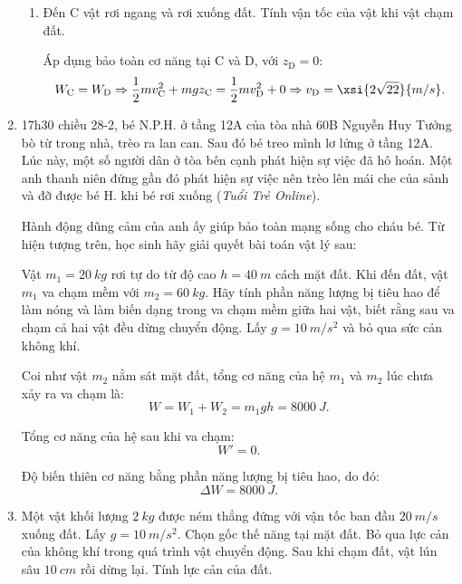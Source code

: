 \begin{enumerate}[label=\bfseries Câu \arabic*:]
{\begin{enumerate}[label=\alph*)]
			Độ cao điểm A là $z_\text{A} = h + R = \SI{4.4}{m}$.
			
			Độ cao điểm C là $z_\text{C} = h = \SI{2}{m}$.
			
			Áp dụng bảo toàn cơ năng tại A và C:
			$$W_\text{A} = W_\text{C} \Rightarrow 0 + mgz_\text A = \dfrac{1}{2}mv_\text{C}^2 + mgz_\text{C} \Rightarrow v_\text{C} = \xsi{4\sqrt 3}{m/s}.$$
			
			\item Đến C vật rơi ngang và rơi xuống đất. Tính vận tốc của vật khi vật chạm đất.
			
			Áp dụng bảo toàn cơ năng tại C và D, với $z_\text{D} = 0$:
			$$W_\text{C} = W_\text{D} \Rightarrow \dfrac{1}{2}mv_\text{C}^2 + mgz_\text{C} = \dfrac{1}{2} mv_\text{D}^2 + 0 \Rightarrow v_\text{D} = \xsi{2\sqrt{22}}{m/s}.$$
		\end{enumerate}
	}
	\item {}
	
	
	{
		17h30 chiều 28-2, bé N.P.H. ở tầng 12A của tòa nhà 60B Nguyễn Huy Tưởng bò từ trong nhà, trèo ra lan can. Sau đó bé treo mình lơ lửng ở tầng 12A. Lúc này, một số người dân ở tòa bên cạnh phát hiện sự việc đã hô hoán. Một anh thanh niên đứng gần đó phát hiện sự việc nên trèo lên mái che của sảnh và đỡ được bé H. khi bé rơi xuống (\textit{Tuổi Trẻ Online}).
		
		Hành động dũng cảm của anh ấy giúp bảo toàn mạng sống cho cháu bé. Từ hiện tượng trên, học sinh hãy giải quyết bài toán vật lý sau:
		
		Vật $m_1=\SI{20}{kg}$ rơi tự do từ độ cao $h=\SI{40}{m}$ cách mặt đất. Khi đến đất, vật $m_1$ va chạm mềm với $m_2=\SI{60}{kg}$. Hãy tính phần năng lượng bị tiêu hao để làm nóng và làm biến dạng trong va chạm mềm giữa hai vật, biết rằng sau va chạm cả hai vật đều dừng chuyển động. Lấy $g=\SI{10}{m/s^2}$ và bỏ qua sức cản không khí.
	}
	
	\hideall
	{	
		Coi như vật $m_2$ nằm sát mặt đất, tổng cơ năng của hệ $m_1$ và $m_2$ lúc chưa xảy ra va chạm là:
		$$W = W_1 + W_2 = m_1gh = \SI{8000}{J}.$$
		
		Tổng cơ năng của hệ sau khi va chạm:
		$$W' = 0.$$
		
		Độ biến thiên cơ năng bằng phần năng lượng bị tiêu hao, do đó:
		$$\Delta W = \SI{8000}{J}.$$
	}
	\item {}
	
	
	{
		Một vật khối lượng $\SI{2}{kg}$ được ném thẳng đứng với vận tốc ban đầu $\SI{20}{m/s}$ xuống đất. Lấy $g=\SI{10}{m/s^2}$. Chọn gốc thế năng tại mặt đất. Bỏ qua lực cản của không khí trong quá trình vật chuyển động. Sau khi chạm đất, vật lún sâu $\SI{10}{cm}$ rồi dừng lại. Tính lực cản của đất.
	}
	

\end{enumerate}
